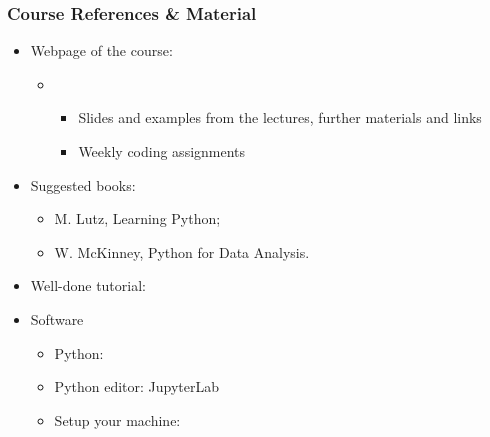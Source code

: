 \begin{frame}
  \frametitle{Course References \& Material}
  \begin{itemize}
  \item Webpage of the course:
	\begin{itemize}
	\item \myurl{\homepage}
  \\ %
  \begin{itemize}
  \item Slides and examples from the lectures, further materials and links
  \item Weekly coding assignments
  \end{itemize}
  \end{itemize}
  \end{itemize}
\begin{itemize}
\item Suggested books: 
\begin{itemize}
	\item M. Lutz, Learning Python; 
	\item W. McKinney, Python for Data Analysis.
	  \end{itemize}
\item Well-done tutorial: 
\item Software
\begin{itemize}
\item Python: 
\item Python editor: JupyterLab  
\item Setup your machine: 
 \myurl{\homepagesetup}
 \end{itemize}
 \end{itemize}
\end{frame}